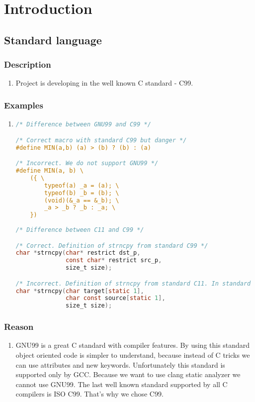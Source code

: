 \section{Introduction}
\subsection{Standard language}
\subsubsection{Description}
    \begin{enumerate}
        \item Project is developing in the well known C standard - C99.
    \end{enumerate}

\subsubsection{Examples}
    \begin{enumerate}
        \item
\begin{lstlisting}[language=C,style=C99]
/* Difference between GNU99 and C99 */

/* Correct macro with standard C99 but danger */
#define MIN(a,b) (a) > (b) ? (b) : (a)

/* Incorrect. We do not support GNU99 */
#define MIN(a, b) \
    ({ \
        typeof(a) _a = (a); \
        typeof(b) _b = (b); \
        (void)(&_a == &_b); \
        _a > _b ? _b : _a; \
    })
    
/* Difference between C11 and C99 */

/* Correct. Definition of strncpy from standard C99 */
char *strncpy(char* restrict dst_p, 
              const char* restrict src_p,
              size_t size);

/* Incorrect. Definition of strncpy from standard C11. In standard C99 we cannot ensure that array has at least one char */
char *strncpy(char target[static 1], 
              char const source[static 1],
              size_t size);
\end{lstlisting} 
    \end{enumerate}

\subsubsection{Reason}
    \begin{enumerate}
        \item GNU99 is a great C standard with compiler features. By using this standard object oriented code is simpler to understand, because instead of C tricks we can use attributes and new keywords. Unfortunately this standard is supported only by GCC. Because we want to use clang static analyzer we cannot use GNU99. The last well known standard supported by all C compilers is ISO C99. That's why we chose C99. 
    \end{enumerate}


